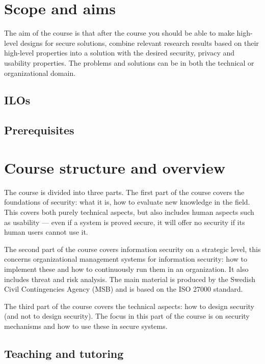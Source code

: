 \section{Scope and aims}%
\label{sec:aim}
The aim of the course is that after the course you should be able to make 
high-level designs for secure solutions, \ie combine relevant research results 
based on their high-level properties into a solution with the desired security, 
privacy and usability properties.
The problems and solutions can be in both the technical or organizational 
domain.

\subsection{\Aclp*{ILO}}


\subsection{Prerequisites}



\section{Course structure and overview}%
\label{CourseStructure}

The course is divided into three parts.
The first part of the course covers the foundations of security: what it is, 
how to evaluate new knowledge in the field.
This covers both purely technical aspects, but also includes human aspects such
as usability --- even if a system is proved secure, it will offer no security 
if its human users cannot use it.

The second part of the course covers information security on a strategic level, 
this concerns organizational management systems for information security: how 
to implement these and how to continuously run them in an organization.
It also includes threat and risk analysis.
The main material is produced by the Swedish Civil Contingencies Agency (MSB) 
and is based on the ISO 27000 standard.

The third part of the course covers the technical aspects: how to design 
security (and not to design security).
The focus in this part of the course is on security mechanisms and how to use 
these in secure systems.

\subsection{Teaching and tutoring}


